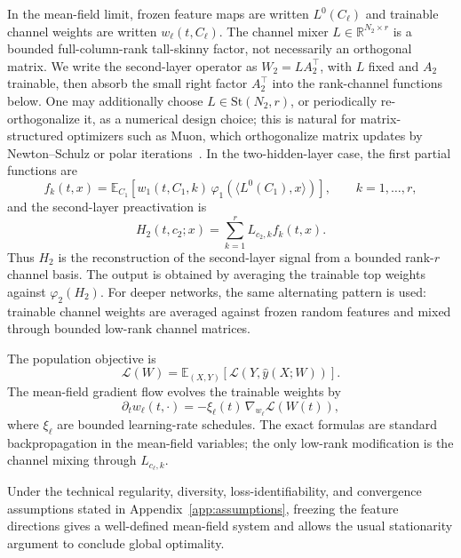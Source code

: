 \documentclass{article}
\newcommand{\R}{\mathbb{R}}
\newcommand{\E}{\mathbb{E}}
\newcommand{\calL}{\mathcal{L}}
\newcommand{\scrL}{\mathcal{L}}
\begin{document}
In the mean-field limit, frozen feature maps are written $L^0(C_\ell)$ and trainable channel weights are written $w_\ell(t,C_\ell)$. The channel mixer $L\in\R^{N_2\times r}$ is a bounded full-column-rank tall-skinny factor, not necessarily an orthogonal matrix. We write the second-layer operator as $W_2=L A_2^\top$, with $L$ fixed and $A_2$ trainable, then absorb the small right factor $A_2^\top$ into the rank-channel functions below. One may additionally choose $L\in\mathrm{St}(N_2,r)$, or periodically re-orthogonalize it, as a numerical design choice; this is natural for matrix-structured optimizers such as Muon, which orthogonalize matrix updates by Newton--Schulz or polar iterations~\cite{jordan2024muon,boreiko2025muon}. In the two-hidden-layer case, the first partial functions are
\begin{equation}
f_k(t,x)=\E_{C_1}\left[w_1(t,C_1,k)\,\varphi_1\left(\langle L^0(C_1),x\rangle\right)\right],
\qquad k=1,\ldots,r,
\end{equation}
and the second-layer preactivation is
\begin{equation}
H_2(t,c_2;x)=\sum_{k=1}^r L_{c_2,k} f_k(t,x).
\end{equation}
Thus $H_2$ is the reconstruction of the second-layer signal from a bounded rank-$r$ channel basis. The output is obtained by averaging the trainable top weights against $\varphi_2(H_2)$. For deeper networks, the same alternating pattern is used: trainable channel weights are averaged against frozen random features and mixed through bounded low-rank channel matrices.

The population objective is
\begin{equation}
\scrL(W)=\E_{(X,Y)}\left[\calL\left(Y,\hat y(X;W)\right)\right].
\end{equation}
The mean-field gradient flow evolves the trainable weights by
\begin{equation}
\partial_t w_\ell(t,\cdot)=-\xi_\ell(t)\,\nabla_{w_\ell}\scrL(W(t)),
\label{eq:generic-flow}
\end{equation}
where $\xi_\ell$ are bounded learning-rate schedules. The exact formulas are standard backpropagation in the mean-field variables; the only low-rank modification is the channel mixing through $L_{c_\ell,k}$.

Under the technical regularity, diversity, loss-identifiability, and convergence assumptions stated in Appendix~\ref{app:assumptions}, freezing the feature directions gives a well-defined mean-field system and allows the usual stationarity argument to conclude global optimality.
\end{document}
